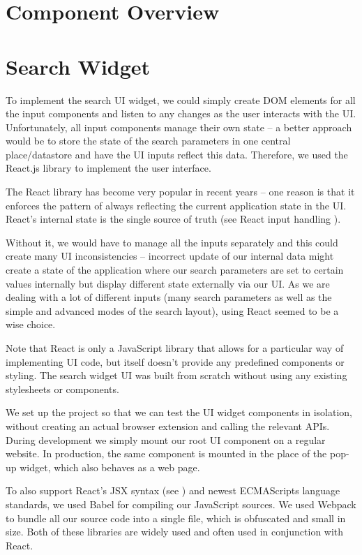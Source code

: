 \documentclass[bsc,frontabs,twoside,singlespacing,parskip,deptreport]{infthesis}
\begin{document}
\section{Component Overview}

\section{Search Widget}
To implement the search UI widget, we could simply create DOM elements for all the input components and listen to any changes as the user interacts with the UI. Unfortunately, all input components manage their own state -- a better approach would be to store the state of the search parameters in one central place/datastore and have the UI inputs reflect this data. Therefore, we used the React.js library to implement the user interface.

The React library \cite{A3} has become very popular in recent years -- one reason is that it enforces the pattern of always reflecting the current application state in the UI. React's internal state is the single source of truth (see React input handling \cite{A4}).

Without it, we would have to manage all the inputs separately and this could create many UI inconsistencies -- incorrect update of our internal data might create a state of the application where our search parameters are set to certain values internally but display different state externally via our UI. As we are dealing with a lot of different inputs (many search parameters as well as the simple and advanced modes of the search layout), using React seemed to be a wise choice.

Note that React is only a JavaScript library that allows for a particular way of implementing UI code, but itself doesn't provide any predefined components or styling. The search widget UI was built from scratch without using any existing stylesheets or components.

We set up the project so that we can test the UI widget components in isolation, without creating an actual browser extension and calling the relevant APIs. During development we simply mount our root UI component on a regular website. In production, the same component is mounted in the place of the pop-up widget, which also behaves as a web page.

To also support React's JSX syntax (see \cite{A5}) and newest ECMAScripts language standards, we used Babel \cite{A6} for compiling our JavaScript sources. We used Webpack \cite{A7} to bundle all our source code into a single file, which is obfuscated and small in size. Both of these libraries are widely used and often used in conjunction with React.
\end{document}
